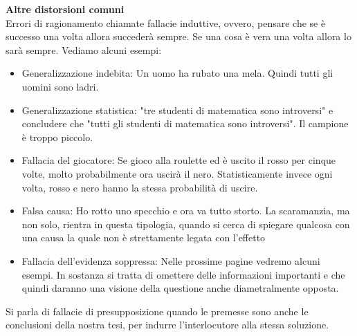 \documentclass[12pt]{book} %
\begin{document}
\noindent \textbf{\large Altre distorsioni comuni} \\
Errori di ragionamento chiamate fallacie induttive, ovvero, pensare che se è successo una volta allora succederà sempre.
Se una cosa è vera una volta allora lo sarà sempre. Vediamo alcuni esempi:

\begin{itemize}
\item Generalizzazione indebita: Un uomo ha rubato una mela. Quindi tutti gli uomini sono ladri.
\item Generalizzazione statistica: "tre studenti di matematica sono introversi" e concludere che "tutti gli studenti di matematica sono introversi". Il campione è troppo piccolo.
\item Fallacia del giocatore: Se gioco alla roulette ed è uscito il rosso per cinque volte, molto probabilmente ora
uscirà il nero. Statisticamente invece ogni volta, rosso e nero hanno la stessa probabilità di uscire.
\item Falsa causa: Ho rotto uno specchio e ora va tutto storto. La scaramanzia, ma non solo, rientra in questa
tipologia, quando si cerca di spiegare qualcosa con una causa la quale non è strettamente legata con
l'effetto
\item Fallacia dell'evidenza soppressa: Nelle prossime pagine vedremo alcuni esempi. In sostanza si tratta di omettere
delle informazioni importanti e che quindi daranno una visione della questione anche diametralmente opposta.
\end{itemize}

Si parla di fallacie di presupposizione quando le premesse sono anche le conclusioni della nostra tesi, per indurre
l'interlocutore alla stessa soluzione.
\end{document}

